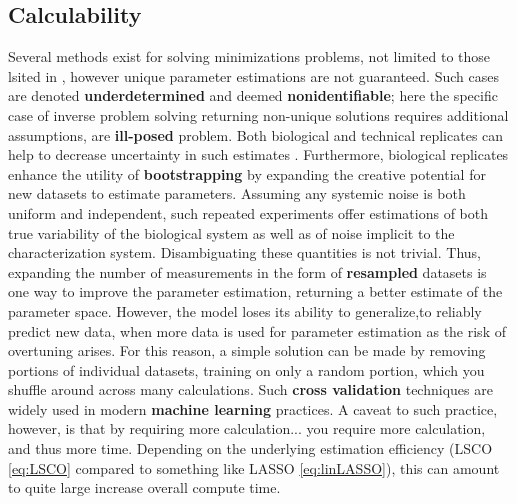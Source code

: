 \subsection{Calculability}
\label{sec:calc}
Several methods exist for solving minimizations problems, not limited to those lsited in , however unique parameter estimations are not guaranteed. Such cases are denoted \textbf{underdetermined} and deemed \textbf{nonidentifiable}; here the specific case of inverse problem solving returning non-unique solutions requires additional assumptions, \ie are \textbf{ill-posed} problem. Both biological and technical replicates can help to decrease uncertainty in such estimates \citep{lee2000importance}. Furthermore, biological replicates enhance the utility of \textbf{bootstrapping} by expanding the creative potential for new datasets to estimate parameters. Assuming any systemic noise is both uniform and independent, such repeated experiments offer estimations of both true variability of the biological system as well as of noise implicit to the characterization system. Disambiguating these quantities is not trivial. Thus, expanding the number of measurements in the form of \textbf{resampled} datasets is one way to improve the parameter estimation, returning a better estimate of the parameter space. However, the model loses its ability to generalize,\ie to reliably predict new data, when more data is used for parameter estimation as the risk of overtuning arises. For this reason, a simple solution can be made by removing portions of individual datasets, training on only a random portion, which you shuffle around across many calculations. Such \textbf{cross validation} techniques are widely used in modern \textbf{machine learning} practices. A caveat to such practice, however, is that by requiring more calculation... you require more calculation, and thus more time. Depending on the underlying estimation efficiency (LSCO \cref{eq:LSCO} compared to something like LASSO \cref{eq:linLASSO}), this can amount to quite large increase overall compute time.



